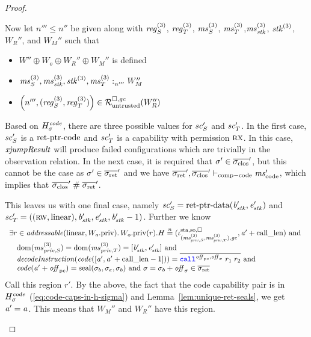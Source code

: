 \begin{proof}
\begin{description}
    Now let $n''' \leq n''$ be given along with $\reg[3]_S$, $\reg[3]_T$, $\ms^{(3)}_S$, $\ms^{(3)}_T$,$\ms^{(3)}_\stk$, $\stk^{(3)}$, $W_R''$, and $W_M''$ such that
    \begin{itemize}
    \item $W'' \oplus W_o \oplus W_R'' \oplus W_M''$ is defined
    \item $\memSat[n''']{\ms^{(3)}_S,\ms^{(3)}_\stk, \stk^{(3)}, \ms^{(3)}_T}{W_M''}$
    \item $\npair[n''']{(\reg[3]_S,\reg[3]_T)} \in \lrr(W_R'')$
    \end{itemize}

    Based on $H_\sigma^\var{code}$, there are three possible values for $\vsc_S'$ and $\vsc_T'$.
    In the first case, $\vsc_S'$ is a $\retptrc$ and $\vsc_T'$ is a capability with permission $\rx$.
    In this case, $\var{xjumpResult}$ will produce failed configurations which are trivially in the observation relation.
    In the next case, it is required that $\sigma' \in \sigcloss'$, but this
    cannot be the case as $\sigma' \in \sigrets'$ and we have $\sigrets',\sigcloss' \vdash_{\mathrm{comp-code}} \mscode'$, which implies that $\sigcloss' \mathrel{\#} \sigrets'$.

    This leaves us with one final case, namely $\vsc_S'= \retptrd(\baddr_\stk',\eaddr_\stk')$ and $\vsc_T'=((\rw,\linear),\baddr_\stk',\eaddr_\stk',\baddr_\stk'-1)$.
    Further we know
    \[
      \begin{array}{l}
        \exists r \in \addressable{\linear,\pwpriv[W_o]} \ldotp \pwpriv[W_o](r).H \nequal (\stareg[(\ms_{\priv,S}^{(3)},\ms_{\priv,T}^{(3)}),\gc]{\spao,\square}, \aaddr'+\calllen) \tand \\
        \quad \dom(\ms_{\priv,S}^{(3)}) = \dom(\ms_{\priv,T}^{(3)}) = [\baddr_\stk',\eaddr_\stk'] \tand\\
        \quad \decInstr{\code([\aaddr',\aaddr' + \calllen-1])} = \overline{\scall{\offpc,\offsigma}{r_1}{r_2}} \tand \\
        \quad \code(\aaddr'+\offpc) = \seal{\sigma_b,\sigma_e,\sigma_b} \tand \sigma = \sigma_b + \offsigma \in \sigrets
      \end{array}
    \]
    Call this region $r'$.
    By the above, the fact that the code capability pair is in $H_\sigma^\var{code}$ (\ref{eq:code-caps-in-h-sigma}) and Lemma~\ref{lem:unique-ret-seals}, we get $\aaddr' = \aaddr$.
    This means that $W_M''$ and $W_R''$ have this region.


\end{description}
\end{proof}
